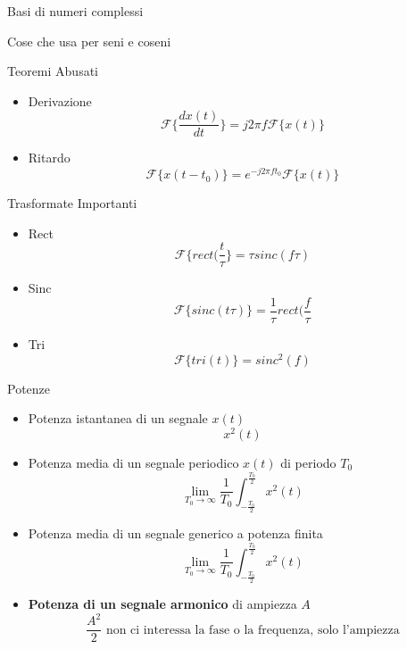 \documentclass{article}
\begin{document}
Basi di numeri complessi

Cose che usa per seni e coseni

Teoremi Abusati

\begin{itemize}
  \item Derivazione \begin{equation*}
    \mathcal{F}\{\frac{dx(t)}{dt}\} = j2\pi f\mathcal{F}\{x(t)\}
  \end{equation*}
  
  \item Ritardo \begin{equation*}
    \mathcal{F}\{x(t-t_0)\} = e^{-j2\pi ft_0} \mathcal{F}\{x(t)\}
  \end{equation*}
\end{itemize}

Trasformate Importanti
\begin{itemize}
  \item Rect \begin{equation*}
    \mathcal{F}\{rect(\frac{t}{\tau }\} = \tau sinc(f\tau )
  \end{equation*}
  
  \item Sinc \begin{equation*}
    \mathcal{F}\{sinc(t\tau )\} = \frac{1}{\tau } rect(\frac{f}{\tau }
  \end{equation*}
  
  \item Tri \begin{equation*}
    \mathcal{F}\{tri(t)\} = sinc^2(f)
  \end{equation*}
\end{itemize}

Potenze
\begin{itemize}
  \item Potenza istantanea di un segnale $x(t)$ \begin{equation*}
    x^2(t)
  \end{equation*} %
    
  \item Potenza media di un segnale periodico $x(t)$ di periodo $T_0$\begin{equation*}
    \lim_{T_0 \to \infty} \frac{1}{T_0} \int_{- \frac{T_0}{2}}^{\frac{T_0}{2}} x^2(t)
  \end{equation*}
  
  \item Potenza media di un segnale generico a potenza finita \begin{equation*}
    \lim_{T_0 \to \infty} \frac{1}{T_0} \int_{- \frac{T_0}{2}}^{\frac{T_0}{2}} x^2(t)
  \end{equation*}
    
  \item \textbf{Potenza di un segnale armonico} di ampiezza $A$ \begin{equation*}
    \frac{A^2}{2} \text{ non ci interessa la fase o la frequenza, solo l'ampiezza}
  \end{equation*}
\end{itemize}
\end{document}
